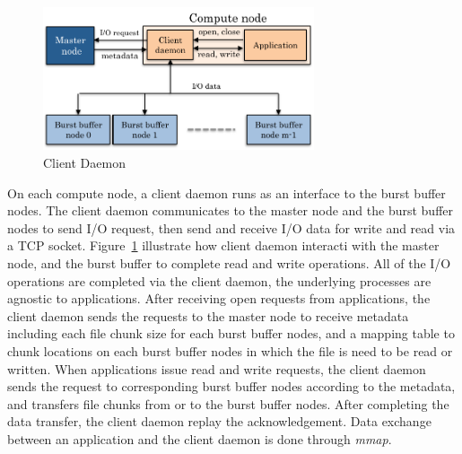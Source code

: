 \begin{figure}[tb]
	\centering
	\includegraphics[width=8cm]{img/client_daemon-2}
	\caption{Client Daemon}
	\label{implementaion:client_daemon}
\end{figure}

On each compute node, a client daemon runs as an interface to the burst buffer
nodes. The client daemon communicates to the master node and the burst buffer
nodes to send I/O request, then send and receive I/O data for write and read
via a TCP socket.
Figure~\ref{implementaion:client_daemon} illustrate how client daemon interacti
with the master node, and the burst buffer to complete read and write
operations. All of the I/O operations are completed via the client daemon, the
underlying processes are agnostic to applications. 
After receiving open requests from applications, 
the client daemon sends the requests to the master node to receive metadata
including each file chunk size for each burst buffer nodes, and a mapping table
to chunk locations on each burst buffer nodes in which the file is need to be
read or written.
When applications issue read and write requests, the client daemon sends the
request to corresponding burst buffer nodes according to the metadata, 
and transfers file chunks from or to the burst buffer nodes. After
completing the data transfer, the client daemon replay the
acknowledgement.
Data exchange between an application and the client daemon is done through
\emph{mmap}.


